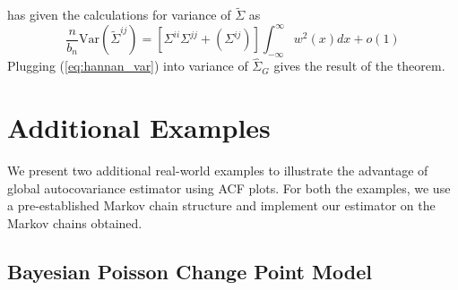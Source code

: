 \documentclass[11pt]{article}
\newcommand{\Var}{\text{Var}}
\theoremstyle{remark}
\begin{document}
\cite{hannan:1970} has given the calculations for variance of $\tilde{\Sigma}$ as 
\begin{equation} \label{eq:hannan_var}
\dfrac{n}{b_n}\Var(\tilde{\Sigma}^{ij}) = \left[\Sigma^{ii}\Sigma^{jj} + \left(\Sigma^{ij} \right) \right]\int_{-\infty}^{\infty}w^2(x)dx + o(1)    
\end{equation}
Plugging (\ref{eq:hannan_var}) into variance of $\hat{\Sigma}_{G}$ gives the result of the theorem.
 

\section{Additional Examples}
We present two additional real-world examples to illustrate the advantage of global autocovariance estimator using ACF plots. For both the examples, we use a pre-established Markov chain structure and implement our estimator on the Markov chains obtained.
\subsection{Bayesian Poisson Change Point Model}

\end{document}
